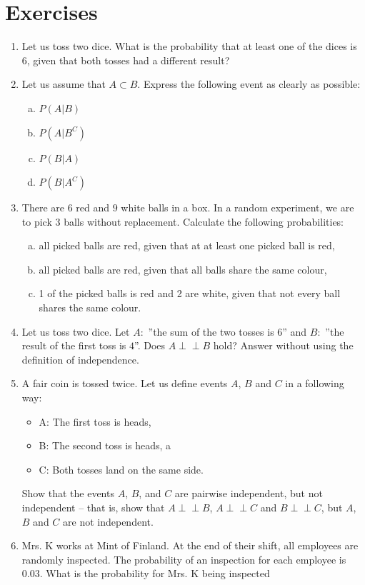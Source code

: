 \documentclass[12pt,a4paper,leqno]{report}
\def\independent{\perp\!\!\!\perp}
\theoremstyle{plain}
\theoremstyle{definition}
\begin{document}
\section{Exercises}
\begin{enumerate}
\item Let us toss two dice. What is the probability that at least one of the dices is $6$, given that both tosses had a different result?
\item Let us assume that $A \subset B$. Express the following event as clearly as possible:
\begin{enumerate}[a)]
    \item $P(A|B)$
    \item $P(A|B^C)$
    \item $P(B|A)$
    \item $P(B|A^C)$
\end{enumerate}
\item There are $6$ red and $9$ white balls in a box. In a random experiment, we are to pick $3$ balls without replacement. Calculate the following probabilities:
\begin{enumerate}[a)]
    \item all picked balls are red, given that at at least one picked ball is red,
    \item all picked balls are red, given that all balls share the same colour, 
    \item 1 of the picked balls is red and 2 are white, given that not every ball shares the same colour.
\end{enumerate}
\item Let us toss two dice. Let $A:$ ''the sum of the two tosses is 6'' and $B:$ ''the result of the first toss is $4$''. Does $A \independent B$ hold? Answer without using the definition of independence.
\item A fair coin is tossed twice. Let us define events $A$, $B$ and $C$ in a following way:
\begin{itemize}
\item A: The first toss is heads,
\item B: The second toss is heads, a
\item C: Both tosses land on the same side.
\end{itemize}
Show that the events $A$, $B$, and $C$ are pairwise independent, but not independent -- that is, show that  $A\independent B$, $A \independent C$ and $B \independent C$, but $A$, $B$ and $C$ are not independent.
\item Mrs. K works at Mint of Finland. At the end of their shift, all employees are randomly inspected. The probability of an inspection for each employee is $0.03$. What is the probability for Mrs. K being inspected 

\end{enumerate}
\end{document}
